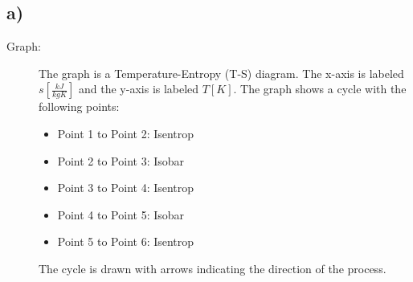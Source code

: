 

\subsection*{a)}

\begin{description}
    \item[Graph:] The graph is a Temperature-Entropy (T-S) diagram. The x-axis is labeled $s \left[ \frac{kJ}{kgK} \right]$ and the y-axis is labeled $T \left[ K \right]$. The graph shows a cycle with the following points:
    \begin{itemize}
        \item Point 1 to Point 2: Isentrop
        \item Point 2 to Point 3: Isobar
        \item Point 3 to Point 4: Isentrop
        \item Point 4 to Point 5: Isobar
        \item Point 5 to Point 6: Isentrop
    \end{itemize}
    The cycle is drawn with arrows indicating the direction of the process.
\end{description}